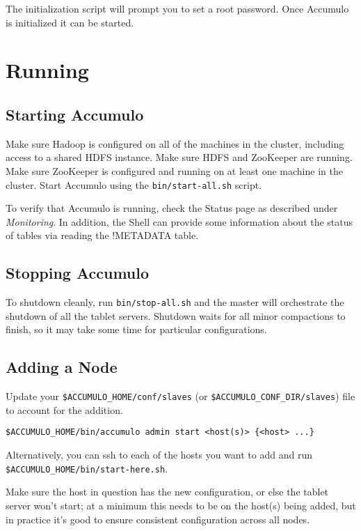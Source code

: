 The initialization script will prompt you to set a root password. Once Accumulo is
initialized it can be started.

\section{Running}

\subsection{Starting Accumulo}

Make sure Hadoop is configured on all of the machines in the cluster, including
access to a shared HDFS instance. Make sure HDFS and ZooKeeper are running.
Make sure ZooKeeper is configured and running on at least one machine in the
cluster.
Start Accumulo using the \texttt{bin/start-all.sh} script.

To verify that Accumulo is running, check the Status page as described under
\emph{Monitoring}. In addition, the Shell can provide some information about the status of
tables via reading the !METADATA table.

\subsection{Stopping Accumulo}

To shutdown cleanly, run \texttt{bin/stop-all.sh} and the master will orchestrate the
shutdown of all the tablet servers. Shutdown waits for all minor compactions to finish, so it may
take some time for particular configurations.

\subsection{Adding a Node}

Update your \texttt{\$ACCUMULO\_HOME/conf/slaves} (or \texttt{\$ACCUMULO\_CONF\_DIR/slaves}) file to account for the addition.

\begin{verbatim}
$ACCUMULO_HOME/bin/accumulo admin start <host(s)> {<host> ...}
\end{verbatim}

Alternatively, you can ssh to each of the hosts you want to add and run 
\texttt{\$ACCUMULO\_HOME/bin/start-here.sh}.

Make sure the host in question has the new configuration, or else the tablet 
server won't start; at a minimum this needs to be on the host(s) being added, 
but in practice it's good to ensure consistent configuration across all nodes.

